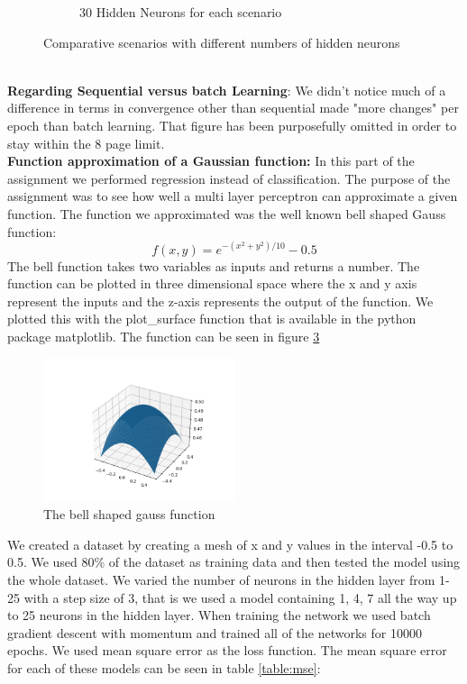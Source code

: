 \documentclass[a4paper]{article}
\begin{document}
\begin{figure}[!htb]
\begin{subfigure}[b]{0.48\textwidth}
        \caption{30 Hidden Neurons for each scenario}
        \label{fig: 30 hidden 3 scenarios}
    \end{subfigure}
    \caption{Comparative scenarios with different numbers of hidden neurons}
    \label{fig: comparative scenarios}
\end{figure}\\
\textbf{Regarding Sequential versus batch Learning}: We didn't notice much of a difference in terms in convergence other than sequential made "more changes" per epoch than batch learning. That figure has been purposefully omitted in order to stay within the 8 page limit.\\
\textbf{Function approximation of a Gaussian function:} In this part of the assignment we performed regression instead of classification. The purpose of the assignment was to see how well a multi layer perceptron can approximate a given function. The function we approximated was the well known bell shaped Gauss function:
$$
f(x, y) = e^{-(x^2+y^2)/10} - 0.5
$$
The bell function takes two variables as inputs and returns a number. The function can be plotted in three dimensional space where the x and y axis represent the inputs and the z-axis represents the output of the function. We plotted this with the plot\_surface function that is available in the python package matplotlib. The function can be seen in figure \ref{fig:gauss-function}

\begin{figure}[htbp]
    \centering
    \includegraphics[width=0.5\textwidth]{Labs/Lab 1/Lab 1b/Figure/Figure_1.png}
    \caption{The bell shaped gauss function}
    \label{fig:gauss-function}
\end{figure}

We created a dataset by creating a mesh of x and y values in the interval -0.5 to 0.5. We used 80\% of the dataset as training data and then tested the model using the whole dataset. We varied the number of neurons in the hidden layer from 1-25 with a step size of 3, that is we used a model containing 1, 4, 7 all the way up to 25 neurons in the hidden layer. When training the network we used batch gradient descent with momentum and trained all of the networks for 10000 epochs. We used mean square error as the loss function. The mean square error for each of these models can be seen in table \ref{table:mse}:
\end{document}
